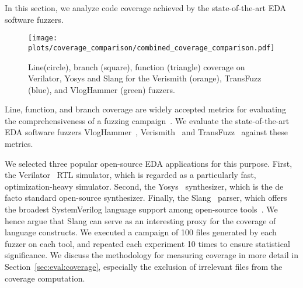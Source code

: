 In this section, we analyze code coverage achieved by the state-of-the-art EDA software fuzzers.

\begin{figure}[t]
    \centering
    \texttt{[image: plots/coverage\_comparison/combined\_coverage\_comparison.pdf]}
    \caption{Line(circle), branch (square), function (triangle) coverage on Verilator, Yosys and Slang for the Verismith (orange), TransFuzz (blue), and VlogHammer (green) fuzzers.
    }
    \label{fig:prev-coverage}
\end{figure}

Line, function, and branch coverage are widely accepted metrics for evaluating the comprehensiveness of a fuzzing campaign~\cite{cadar2008klee,fraser2011evosuite,pacheco2007feedback,godefroid2005dart}.
We evaluate the state-of-the-art EDA software fuzzers VlogHammer~\cite{vloghammer}, Verismith~\cite{verismith} and TransFuzz~\cite{mirtl} against these metrics.

We selected three popular open-source EDA applications for this purpose.
First, the Verilator~\cite{Snyder2024Verilator} RTL simulator, which is regarded as a particularly fast, optimization-heavy simulator.
Second, the Yosys~\cite{wolf2013yosys} synthesizer, which is the de facto standard open-source synthesizer.
Finally, the Slang~\cite{popoloski2019slang} parser, which offers the broadest SystemVerilog language support among open-source tools~\cite{chipsalliance}. We hence argue that Slang can serve as an interesting proxy for the coverage of language constructs.
We executed a campaign of 100 files generated by each fuzzer on each tool, and repeated each experiment 10 times to ensure statistical significance.
We discuss the methodology for measuring coverage in more detail in Section~\ref{sec:eval:coverage}, especially the exclusion of irrelevant files from the coverage computation.

